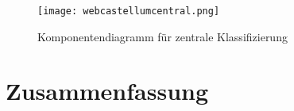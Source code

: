 \begin{figure}[h]
    \centering
    \texttt{[image: webcastellumcentral.png]}
    \caption{Komponentendiagramm für zentrale Klassifizierung}
    \label{fig:my_future}
\end{figure}



\section{Zusammenfassung}

